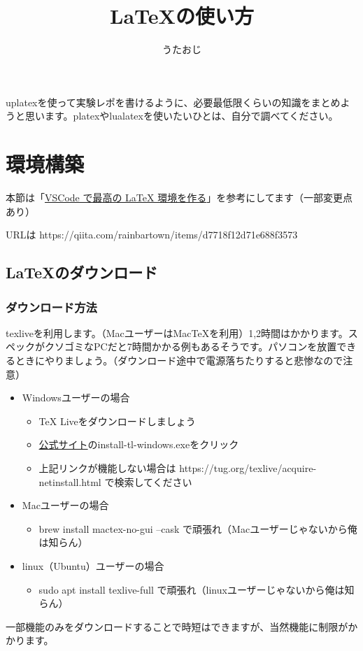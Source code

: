 \documentclass[uplatex,dvipdfmx]{jsarticle}
\numberwithin{equation}{section}
\begin{document}
\title{\LaTeX の使い方} 
\author{うたおじ}
\date{}
\maketitle
uplatexを使って実験レポを書けるように、必要最低限くらいの知識をまとめようと思います。platexやlualatexを使いたいひとは、自分で調べてください。
\section{環境構築}
本節は「\href{https://qiita.com/rainbartown/items/d7718f12d71e688f3573}{VSCode で最高の LaTeX 環境を作る}」を参考にしてます（一部変更点あり）

URLは https://qiita.com/rainbartown/items/d7718f12d71e688f3573
\subsection{LaTeXのダウンロード}
\subsubsection{ダウンロード方法}
texliveを利用します。（MacユーザーはMacTeXを利用）1,2時間はかかります。スペックがクソゴミなPCだと7時間かかる例もあるそうです。パソコンを放置できるときにやりましょう。（ダウンロード途中で電源落ちたりすると悲惨なので注意）
\begin{itemize}
  \item Windowsユーザーの場合
  \begin{itemize}
    \item TeX Liveをダウンロードしましょう
    \item \href{https://tug.org/texlive/acquire-netinstall.html}{公式サイト}のinstall-tl-windows.exeをクリック
    \item 上記リンクが機能しない場合は https://tug.org/texlive/acquire-netinstall.html で検索してください
  \end{itemize}
  \item Macユーザーの場合
  \begin{itemize}
    \item brew install mactex-no-gui --cask で頑張れ（Macユーザーじゃないから俺は知らん）
  \end{itemize}
  \item linux（Ubuntu）ユーザーの場合
  \begin{itemize}
    \item sudo apt install texlive-full で頑張れ（linuxユーザーじゃないから俺は知らん）
  \end{itemize}
\end{itemize}
一部機能のみをダウンロードすることで時短はできますが、当然機能に制限がかかります。
\end{document}
